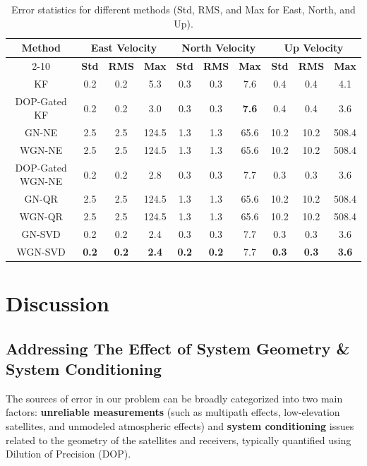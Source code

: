 \documentclass[conference]{IEEEtran}
\begin{document}
\begin{table}[h!]
\centering
\begin{tabular}{|c|c|c|c|c|c|c|c|c|c|}
\hline
\textbf{Method} & \multicolumn{3}{c|}{\textbf{East Velocity}} & \multicolumn{3}{c|}{\textbf{North Velocity}} & \multicolumn{3}{c|}{\textbf{Up Velocity}} \\
\cline{2-10}
 & \textbf{Std} & \textbf{RMS} & \textbf{Max} & \textbf{Std} & \textbf{RMS} & \textbf{Max} & \textbf{Std} & \textbf{RMS} & \textbf{Max} \\
\hline
KF & 0.2 & 0.2 & 5.3 & 0.3 & 0.3 & 7.6 & 0.4 & 0.4 & 4.1 \\
\hline
DOP-Gated KF & 0.2 & 0.2 & 3.0 & 0.3 & 0.3 & \textbf{7.6} & 0.4 & 0.4 & 3.6 \\
\hline
GN-NE & 2.5 & 2.5 & 124.5 & 1.3 & 1.3 & 65.6 & 10.2 & 10.2 & 508.4 \\
\hline
WGN-NE & 2.5 & 2.5 & 124.5 & 1.3 & 1.3 & 65.6 & 10.2 & 10.2 & 508.4 \\
\hline
DOP-Gated WGN-NE & 0.2 & 0.2 & 2.8 & 0.3 & 0.3 & 7.7 & 0.3 & 0.3 & 3.6 \\
\hline
GN-QR & 2.5 & 2.5 & 124.5 & 1.3 & 1.3 & 65.6 & 10.2 & 10.2 & 508.4 \\
\hline
WGN-QR & 2.5 & 2.5 & 124.5 & 1.3 & 1.3 & 65.6 & 10.2 & 10.2 & 508.4 \\
\hline
GN-SVD & 0.2 & 0.2 & 2.4 & 0.3 & 0.3 & 7.7 & 0.3 & 0.3 & 3.6 \\
\hline
WGN-SVD & \textbf{0.2} & \textbf{0.2} & \textbf{2.4} & \textbf{0.2} & \textbf{0.2} & 7.7 & \textbf{0.3} & \textbf{0.3} & \textbf{3.6} \\
\hline
\end{tabular}
\caption{Error statistics for different methods (Std, RMS, and Max for East, North, and Up).}
\label{tab:velocity_error_stats}
\end{table}


\section{Discussion}

\subsection{Addressing The Effect of System Geometry \& System Conditioning}

The sources of error in our problem can be broadly categorized into two main factors: \textbf{unreliable measurements} (such as multipath effects, low-elevation satellites, and unmodeled atmospheric effects) and \textbf{system conditioning} issues related to the geometry of the satellites and receivers, typically quantified using Dilution of Precision (DOP).
\end{document}
